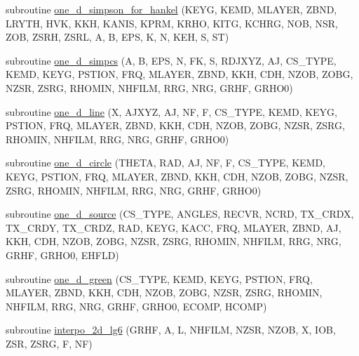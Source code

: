 \begin{DoxyCompactItemize}
\item 
subroutine \hyperlink{Marco_8f90_ae2b61db0662a54d96d5e7f9a663349de}{one\+\_\+d\+\_\+simpson\+\_\+for\+\_\+hankel} (K\+E\+YG, K\+E\+MD, M\+L\+A\+Y\+ER, Z\+B\+ND, L\+R\+Y\+TH, H\+VK, K\+KH, K\+A\+N\+IS, K\+P\+RM, K\+R\+HO, K\+I\+TG, K\+C\+H\+RG, N\+OB, N\+SR, Z\+OB, Z\+S\+RH, Z\+S\+RL, A, B, E\+PS, K, N, K\+EH, S, ST)
\item 
subroutine \hyperlink{Marco_8f90_a46b85cd0c09e93d5bc756ae19f71f302}{one\+\_\+d\+\_\+simpcs} (A, B, E\+PS, N, FK, S, R\+D\+J\+X\+YZ, AJ, C\+S\+\_\+\+T\+Y\+PE, K\+E\+MD, K\+E\+YG, P\+S\+T\+I\+ON, F\+RQ, M\+L\+A\+Y\+ER, Z\+B\+ND, K\+KH, C\+DH, N\+Z\+OB, Z\+O\+BG, N\+Z\+SR, Z\+S\+RG, R\+H\+O\+M\+IN, N\+H\+F\+I\+LM, R\+RG, N\+RG, G\+R\+HF, G\+R\+H\+O0)
\item 
subroutine \hyperlink{Marco_8f90_a74c7c00c978f674115ec54ae3c5f1870}{one\+\_\+d\+\_\+line} (X, A\+J\+X\+YZ, AJ, NF, F, C\+S\+\_\+\+T\+Y\+PE, K\+E\+MD, K\+E\+YG, P\+S\+T\+I\+ON, F\+RQ, M\+L\+A\+Y\+ER, Z\+B\+ND, K\+KH, C\+DH, N\+Z\+OB, Z\+O\+BG, N\+Z\+SR, Z\+S\+RG, R\+H\+O\+M\+IN, N\+H\+F\+I\+LM, R\+RG, N\+RG, G\+R\+HF, G\+R\+H\+O0)
\item 
subroutine \hyperlink{Marco_8f90_acfdc9c842d9566d75829e363d5bf3f41}{one\+\_\+d\+\_\+circle} (T\+H\+E\+TA, R\+AD, AJ, NF, F, C\+S\+\_\+\+T\+Y\+PE, K\+E\+MD, K\+E\+YG, P\+S\+T\+I\+ON, F\+RQ, M\+L\+A\+Y\+ER, Z\+B\+ND, K\+KH, C\+DH, N\+Z\+OB, Z\+O\+BG, N\+Z\+SR, Z\+S\+RG, R\+H\+O\+M\+IN, N\+H\+F\+I\+LM, R\+RG, N\+RG, G\+R\+HF, G\+R\+H\+O0)
\item 
subroutine \hyperlink{Marco_8f90_a278c841b3ca2d9c2a1e36c458d370cbe}{one\+\_\+d\+\_\+source} (C\+S\+\_\+\+T\+Y\+PE, A\+N\+G\+L\+ES, R\+E\+C\+VR, N\+C\+RD, T\+X\+\_\+\+C\+R\+DX, T\+X\+\_\+\+C\+R\+DY, T\+X\+\_\+\+C\+R\+DZ, R\+AD, K\+E\+YG, K\+A\+CC, F\+RQ, M\+L\+A\+Y\+ER, Z\+B\+ND, AJ, K\+KH, C\+DH, N\+Z\+OB, Z\+O\+BG, N\+Z\+SR, Z\+S\+RG, R\+H\+O\+M\+IN, N\+H\+F\+I\+LM, R\+RG, N\+RG, G\+R\+HF, G\+R\+H\+O0, E\+H\+F\+LD)
\item 
subroutine \hyperlink{Marco_8f90_a8366534c83a3217b6271dd5a9d5b8917}{one\+\_\+d\+\_\+green} (C\+S\+\_\+\+T\+Y\+PE, K\+E\+MD, K\+E\+YG, P\+S\+T\+I\+ON, F\+RQ, M\+L\+A\+Y\+ER, Z\+B\+ND, K\+KH, C\+DH, N\+Z\+OB, Z\+O\+BG, N\+Z\+SR, Z\+S\+RG, R\+H\+O\+M\+IN, N\+H\+F\+I\+LM, R\+RG, N\+RG, G\+R\+HF, G\+R\+H\+O0, E\+C\+O\+MP, H\+C\+O\+MP)
\item 
subroutine \hyperlink{Marco_8f90_a170a0edeb8c14a416b4ec927bd0b5761}{interpo\+\_\+2d\+\_\+lg6} (G\+R\+HF, A, L, N\+H\+F\+I\+LM, N\+Z\+SR, N\+Z\+OB, X, I\+OB, Z\+SR, Z\+S\+RG, F, NF)

\end{DoxyCompactItemize}
